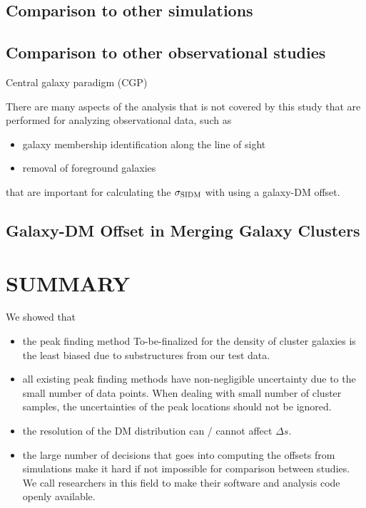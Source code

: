 \label{sec:discussion}
\subsection{Comparison to other simulations}
\subsection{Comparison to other observational studies}
Central galaxy paradigm (CGP)


There are many aspects of the analysis that is not covered by this study that
are performed for analyzing observational data, such as 

\begin{itemize}
		\item galaxy membership identification along the line of sight
		\item removal of foreground galaxies  
	\end{itemize}
	that are important for calculating the $\sigma_{\rm SIDM}$ with using a
	galaxy-DM offset. 


\subsection{Galaxy-DM Offset in Merging Galaxy Clusters}

\section{SUMMARY}
We showed that 
\begin{itemize}
		\item  the peak finding method To-be-finalized for the density of cluster
			galaxies is the least biased due to substructures from our test data. 
		\item  all existing peak finding methods have non-negligible uncertainty 
			due to the small number of data points. When dealing with small number of
			cluster samples, the uncertainties of the peak locations should not be
			ignored.
		\item the resolution of the DM distribution can / cannot affect
			$\Delta s$.   
		\item the large number of decisions that goes into computing the offsets
			from simulations make it hard if not impossible for comparison between studies. 
			We call researchers in this field to make their software and analysis code openly
			available.
\end{itemize}




